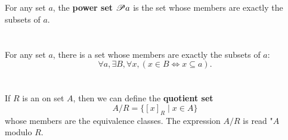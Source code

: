 \documentclass{report}
\begin{document}
\begin{definition}


\end{definition}

\section{}%
\label{ref:power-set}

For any set $a$, the \textbf{power set $\mathscr{P}a$} is the set whose members
  are exactly the subsets of $a$.

\begin{definition}


\end{definition}

\section{}%
\label{ref:power-set-axiom}

For any set $a$, there is a set whose members are exactly the subsets of $a$:
  $$\forall a, \exists B, \forall x, (x \in B \iff x \subseteq a).$$

\begin{axiom}


\end{axiom}

\section{}%
\label{ref:quotient-set}

If $R$ is an  on set $A$, then we can define
  the \textbf{quotient set} $$A / R = \{[x]_R \mid x \in A\}$$ whose members are
  the equivalence classes.
The expression $A / R$ is read "$A$ modulo $R$.

\begin{definition}


\end{definition}

\section{}%
\label{ref:range}
\end{document}
